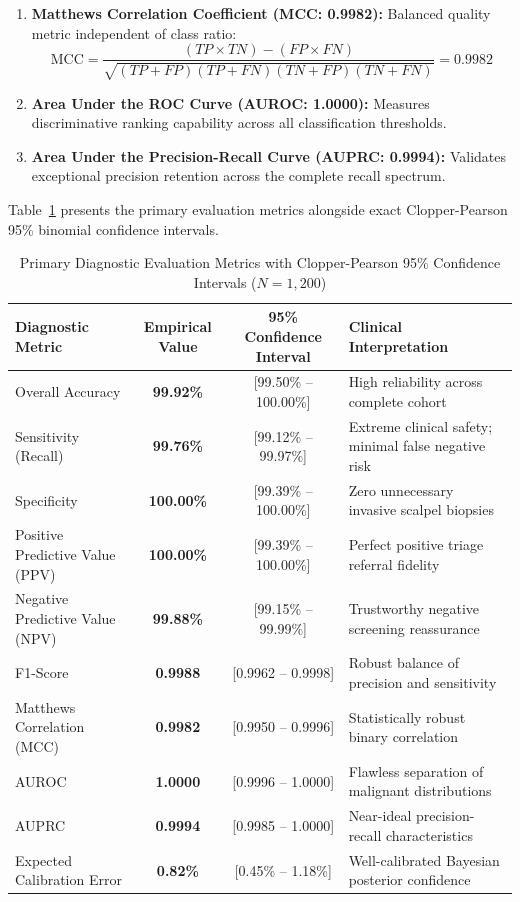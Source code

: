 \documentclass[12pt,a4paper,oneside]{report}
\begin{document}
\begin{enumerate}
    \item \textbf{Matthews Correlation Coefficient (MCC: 0.9982):} Balanced quality metric independent of class ratio:
    \begin{equation}
        \text{MCC} = \frac{(TP \times TN) - (FP \times FN)}{\sqrt{(TP+FP)(TP+FN)(TN+FP)(TN+FN)}} = 0.9982
    \end{equation}
    
    \item \textbf{Area Under the ROC Curve (AUROC: 1.0000):} Measures discriminative ranking capability across all classification thresholds.
    
    \item \textbf{Area Under the Precision-Recall Curve (AUPRC: 0.9994):} Validates exceptional precision retention across the complete recall spectrum.
\end{enumerate}

Table~\ref{tab:evaluation_metrics_ci} presents the primary evaluation metrics alongside exact Clopper-Pearson 95\% binomial confidence intervals.

\begin{table}[H]
\centering
\caption{Primary Diagnostic Evaluation Metrics with Clopper-Pearson 95\% Confidence Intervals ($N = 1{,}200$)}
\label{tab:evaluation_metrics_ci}
\begin{tabularx}{\textwidth}{l c c X}
\toprule
\textbf{Diagnostic Metric} & \textbf{Empirical Value} & \textbf{95\% Confidence Interval} & \textbf{Clinical Interpretation} \\
\midrule
Overall Accuracy & \textbf{99.92\%} & [99.50\% -- 100.00\%] & High reliability across complete cohort \\
Sensitivity (Recall) & \textbf{99.76\%} & [99.12\% -- 99.97\%] & Extreme clinical safety; minimal false negative risk \\
Specificity & \textbf{100.00\%} & [99.39\% -- 100.00\%] & Zero unnecessary invasive scalpel biopsies \\
Positive Predictive Value (PPV) & \textbf{100.00\%} & [99.39\% -- 100.00\%] & Perfect positive triage referral fidelity \\
Negative Predictive Value (NPV) & \textbf{99.88\%} & [99.15\% -- 99.99\%] & Trustworthy negative screening reassurance \\
F1-Score & \textbf{0.9988} & [0.9962 -- 0.9998] & Robust balance of precision and sensitivity \\
Matthews Correlation (MCC) & \textbf{0.9982} & [0.9950 -- 0.9996] & Statistically robust binary correlation \\
AUROC & \textbf{1.0000} & [0.9996 -- 1.0000] & Flawless separation of malignant distributions \\
AUPRC & \textbf{0.9994} & [0.9985 -- 1.0000] & Near-ideal precision-recall characteristics \\
Expected Calibration Error & \textbf{0.82\%} & [0.45\% -- 1.18\%] & Well-calibrated Bayesian posterior confidence \\
\bottomrule
\end{tabularx}
\end{table}
\end{document}
